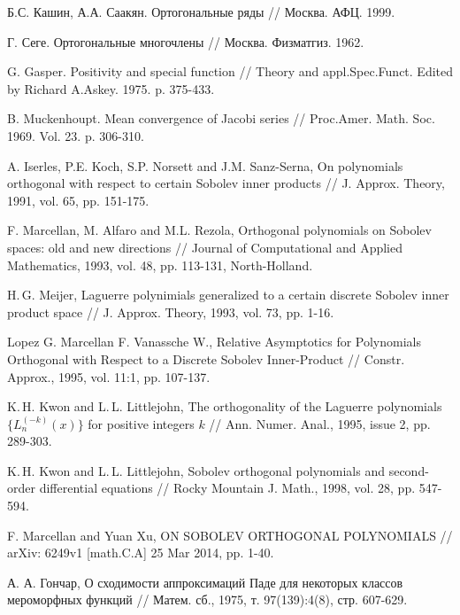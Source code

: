  Б.С. Кашин, А.А. Саакян. Ортогональные ряды // Москва. АФЦ. 1999.

 Г. Сеге. Ортогональные многочлены // Москва. Физматгиз. 1962.

 G. Gasper. Positivity and special function // Theory and appl.Spec.Funct. Edited by Richard A.Askey. 1975. p. 375-433.

 B. Muckenhoupt. Mean convergence of Jacobi series // Proc.Amer. Math. Soc. 1969. Vol. 23.  p. 306-310.



 A. Iserles, P.E. Koch, S.P. Norsett and J.M. Sanz-Serna, On polynomials  orthogonal  with respect  to certain Sobolev inner products // J. Approx. Theory, 1991, vol. 65, pp. 151-175.



 F. Marcellan, M. Alfaro and M.L. Rezola, Orthogonal polynomials on Sobolev spaces: old and new directions // Journal of Computational and Applied Mathematics, 1993, vol. 48, pp. 113-131, North-Holland.


 H.\,G. Meijer, Laguerre polynimials generalized to a certain discrete Sobolev inner product space // J. Approx. Theory, 1993, vol. 73, pp. 1-16.

 Lopez G. Marcellan F. Vanassche W., Relative Asymptotics for Polynomials Orthogonal with Respect to a Discrete Sobolev Inner-Product // Constr. Approx., 1995, vol. 11:1, pp. 107-137.

 K.\,H. Kwon and L.\,L. Littlejohn, The orthogonality of the Laguerre polynomials $\{L_n^{(-k)}(x)\}$ for positive integers $k$ // Ann. Numer. Anal., 1995, issue 2, pp. 289-303.

 K.\,H. Kwon and L.\,L. Littlejohn, Sobolev orthogonal polynomials and second-order differential equations // Rocky Mountain J. Math., 1998, vol. 28, pp. 547-594.

 F. Marcellan and Yuan Xu, ON SOBOLEV ORTHOGONAL POLYNOMIALS // arXiv: 6249v1 [math.C.A] 25 Mar 2014, pp. 1-40.


 А. А. Гончар, О сходимости аппроксимаций Паде для некоторых классов мероморфных функций // Матем. сб., 1975, т. 97(139):4(8), стр. 607-629.



